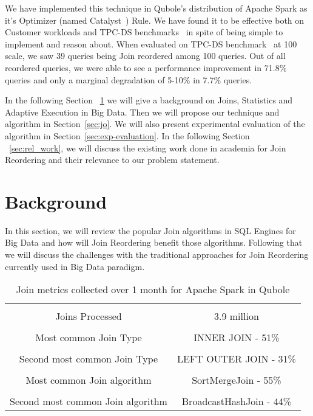 \documentclass[conference]{IEEEtran}
\begin{document}
We have implemented this technique in Qubole's distribution of Apache Spark as it's Optimizer (named Catalyst~\cite{b13}) Rule. We have found it to be effective both on Customer workloads and TPC-DS benchmarks~\cite{b14} in spite of being simple to implement and reason about. When evaluated on TPC-DS benchmark~\cite{b14}  at 100 scale, we saw 39 queries being Join reordered among 100 queries. Out of all reordered queries, we were able to see a performance improvement in 71.8\% queries and only a marginal degradation of 5-10\% in 7.7\% queries.

In the following Section ~\ref{sec:background} we will give a background on Joins, Statistics and Adaptive Execution in Big Data. Then we will propose our technique and algorithm in Section~\ref{sec:jo}. We will also present experimental evaluation of the algorithm in Section~\ref{sec:exp-evaluation}. In the following Section ~\ref{sec:rel_work}, we will discuss the existing work done in academia for Join Reordering and their relevance to our problem statement.

\section{Background}\label{sec:background}

In this section, we will review the popular Join algorithms in SQL Engines for Big Data and how will Join Reordering benefit those algorithms. Following that we will discuss the challenges with the traditional approaches for Join Reordering currently used in Big Data paradigm.

\begin{table}[h]
\begin{center}
\begin{tabular}{ |c|c| }
 \hline \\
Joins Processed & 3.9 million \\ \hline \\
Most common Join Type & INNER JOIN - 51\%  \\  \hline \\
Second most common Join Type &  LEFT OUTER JOIN - 31\%\\ \hline  \\
Most common Join algorithm & SortMergeJoin - 55\%\\ \hline \\
Second most common Join algorithm & BroadcastHashJoin - 44\%\\
 \hline
\end{tabular}
\label{tab:stats}
\end{center}
\caption{Join metrics collected over 1 month for Apache Spark in Qubole}
\end{table}
\end{document}
